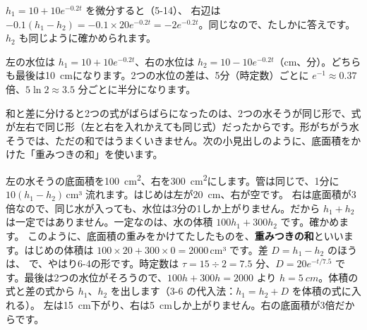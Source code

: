 $h_1=10+10e^{-0.2t}$ を微分すると（5-14）、
右辺は $-0.1(h_1-h_2)=-0.1\times20e^{-0.2t}=-2e^{-0.2t}$。同じなので、たしかに答えです。$h_2$ も同じように確かめられます。

左の水位は $h_1=10+10e^{-0.2t}$、右の水位は $h_2=10-10e^{-0.2t}$（cm、分）。どちらも最後は\qty{10}{cm}になります。2つの水位の差は、5分（時定数）ごとに $e^{-1}\approx0.37$ 倍、$5\ln2\approx3.5$ 分ごとに半分になります。

\begin{bkfigure}
\end{bkfigure}

\begin{seikaku}
和と差に分けると2つの式がばらばらになったのは、2つの水そうが同じ形で、式が左右で同じ形（左と右を入れかえても同じ式）だったからです。形がちがう水そうでは、ただの和ではうまくいきません。次の小見出しのように、底面積をかけた「重みつきの和」を使います。
\end{seikaku}

左の水そうの底面積を\qty{100}{cm^2}、右を\qty{300}{cm^2}にします。管は同じで、1分に $10(h_1-h_2)$\,cm³ 流れます。はじめは左が\qty{20}{cm}、右が空です。
右は底面積が3倍なので、同じ水が入っても、水位は3分の1しか上がりません。だから $h_1+h_2$ は一定ではありません。一定なのは、水の体積 $100h_1+300h_2$ です。確かめます。
このように、底面積の重みをかけてたしたものを、\textbf{重みつきの和}といいます。はじめの体積は $100\times20+300\times0=2000$\,cm³ です。差 $D=h_1-h_2$ のほうは、
で、やはり6-4の形です。時定数は $\tau=15\div2=7.5$ 分、$D=20e^{-t/7.5}$ です。最後は2つの水位がそろうので、$100h+300h=2000$ より $h=\qty{5}{cm}$。体積の式と差の式から $h_1$、$h_2$ を出します（3-6 の代入法：$h_1=h_2+D$ を体積の式に入れる）。
左は\qty{15}{cm}下がり、右は\qty{5}{cm}しか上がりません。右の底面積が3倍だからです。


